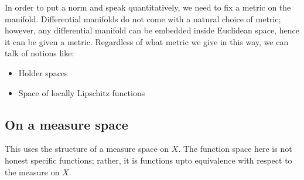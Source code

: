 \documentclass[a4paper]{amsart}
\begin{document}
In order to put a norm and speak quantitatively, we need to fix a
metric on the manifold. Differential manifolds do not come with a
natural choice of metric; however, any differential manifold can be
embedded inside Euclidean space, hence it can be given a
metric. Regardless of what metric we give in this way, we can talk of
notions like:

\begin{itemize}

\item Holder spaces

\item Space of locally Lipschitz functions

\end{itemize}

\subsection{On a measure space}

This uses the structure of a measure space on $X$. The function space
here is not honest specific functions; rather, it is functions upto
equivalence with respect to the measure on $X$.
 
\end{document}
